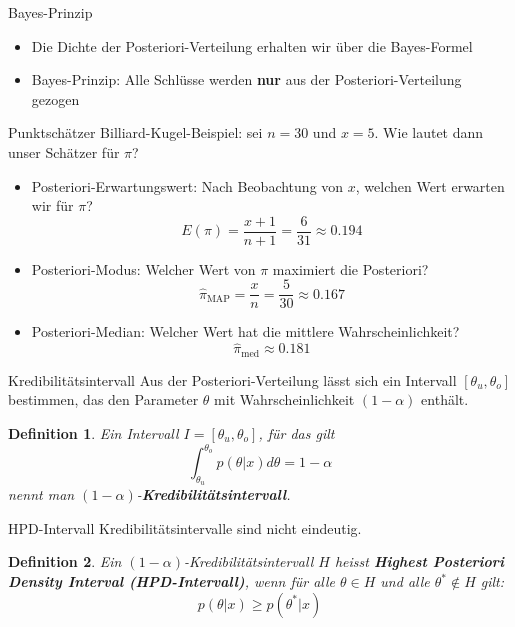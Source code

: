 \documentclass[german]{beamer}
\newtheorem{Def}{Definition}
\numberwithin{Bsp}{section}
\numberwithin{Def}{section}
\numberwithin{Stz}{section}
\begin{document}
\begin{frame}{Bayes-Prinzip}
\begin{itemize}
\item Die Dichte der Posteriori-Verteilung erhalten wir über die Bayes-Formel
\end{itemize}
\begin{center}
\end{center}
\begin{itemize}
\item Bayes-Prinzip: Alle Schlüsse werden \textbf{nur} aus der Posteriori-Verteilung gezogen
\end{itemize}
\end{frame}

\begin{frame}{Punktschätzer}
Billiard-Kugel-Beispiel: sei $n=30$ und $x=5$. Wie lautet dann unser Schätzer für $\pi$? 
\begin{itemize}
\item Posteriori-Erwartungswert: Nach Beobachtung von $x$, welchen Wert erwarten wir für $\pi$?\\
$$ E(\pi)=\frac{x+1}{n+1}=\frac{6}{31}\approx 0.194$$
\item Posteriori-Modus: Welcher Wert von $\pi$ maximiert die Posteriori?
$$ \hat{\pi}_{\text{MAP}}=\frac{x}{n}=\frac{5}{30} \approx 0.167$$
\item Posteriori-Median: Welcher Wert hat die mittlere Wahrscheinlichkeit?
$$ \hat{\pi}_{\text{med}}\approx 0.181$$
\end{itemize}
\end{frame}

\begin{frame}{Kredibilitätsintervall}
Aus der Posteriori-Verteilung lässt sich ein Intervall $[\theta_u, \theta_o]$ bestimmen, das den Parameter $\theta$ mit Wahrscheinlichkeit $(1-\alpha)$ enthält.
\begin{Def}
Ein Intervall $I = [\theta_u, \theta_o]$, für das gilt
\[ 
\int_{\theta_u}^{\theta_o} p(\theta|x)d\theta = 1-\alpha
\]
nennt man $(1-\alpha)$-\textbf{Kredibilitätsintervall}.
\end{Def}
\end{frame}

\begin{frame}{HPD-Intervall}
Kredibilitätsintervalle sind nicht eindeutig. 
\begin{Def}
Ein $(1-\alpha)$-Kredibilitätsintervall $H$ heisst \textbf{Highest Posteriori Density Interval (HPD-Intervall)}, wenn für alle $\theta \in H$ und alle $\theta^* \not\in H$ gilt:
\[ p(\theta|x) \geq p(\theta^*|x) \]
\end{Def}
\end{frame}
\end{document}
